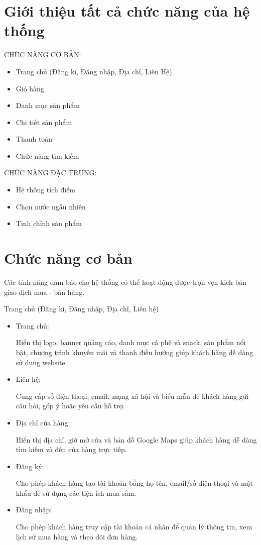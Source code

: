 \documentclass[a4paper,12pt]{report}
\numberwithin{equation}{chapter}
\begin{document}
\section{Giới thiệu tất cả chức năng của hệ thống}
CHỨC NĂNG CƠ BẢN:
\begin{itemize}[leftmargin=2.2cm]
\item Trang chủ (Đăng kí, Đăng nhập, Địa chỉ, Liên Hệ)
\item Giỏ hàng
\item Danh mục sản phẩm
\item Chi tiết sản phẩm
\item Thanh toán
\item Chức năng tìm kiếm
\end{itemize}
CHỨC NĂNG ĐẶC TRƯNG:
\begin{itemize}[leftmargin=2.2cm]
\item Hệ thống tích điểm
\item Chọn nước ngẫu nhiên
\item Tinh chỉnh sản phẩm
\end{itemize}
\section{Chức năng cơ bản}
Các tính năng đảm bảo cho hệ thống có thể hoạt động được trọn vẹn kịch bản giao dịch mua - bán hàng.

Trang chủ (Đăng kí, Đăng nhập, Địa chỉ, Liên hệ)
\begin{itemize}[leftmargin=2.2cm]
\item Trang chủ:

Hiển thị logo, banner quảng cáo, danh mục cà phê và snack, sản phẩm nổi bật, chương trình khuyến mãi và thanh điều hướng giúp khách hàng dễ dàng sử dụng website.
\item Liên hệ:

Cung cấp số điện thoại, email, mạng xã hội và biểu mẫu để khách hàng gửi câu hỏi, góp ý hoặc yêu cầu hỗ trợ.
\item Địa chỉ cửa hàng:

Hiển thị địa chỉ, giờ mở cửa và bản đồ Google Maps giúp khách hàng dễ dàng tìm kiếm và đến cửa hàng trực tiếp.
\item Đăng ký: 

Cho phép khách hàng tạo tài khoản bằng họ tên, email/số điện thoại và mật khẩu để sử dụng các tiện ích mua sắm.
\item Đăng nhập:

Cho phép khách hàng truy cập tài khoản cá nhân để quản lý thông tin, xem lịch sử mua hàng và theo dõi đơn hàng.
\end{itemize}
\end{document}
